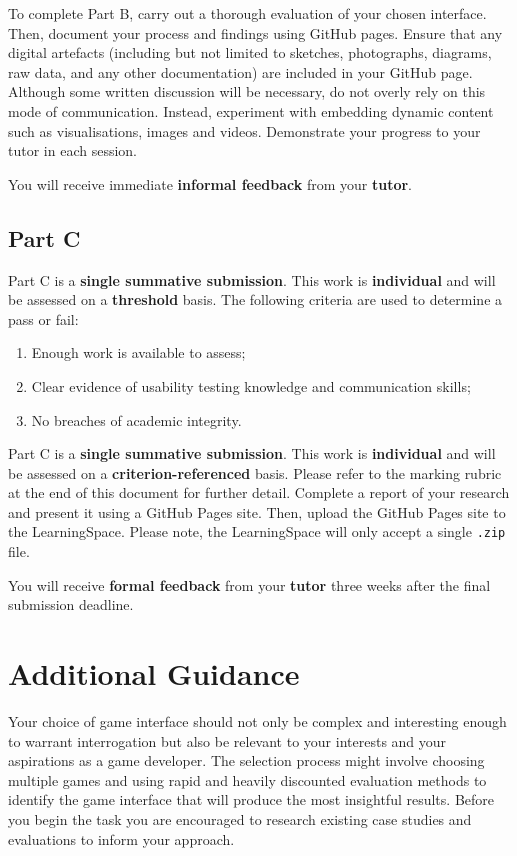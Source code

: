 \documentclass{../../fal_assignment}
\begin{document}
To complete Part B, carry out a thorough evaluation of your chosen interface. Then, document your process and findings using GitHub pages. Ensure that any digital artefacts (including but not limited to sketches, photographs, diagrams, raw data, and any other documentation) are included in your GitHub page. Although some written discussion will be necessary, do not overly rely on this mode of communication. Instead, experiment with embedding dynamic content such as visualisations, images and videos. Demonstrate your progress to your tutor in each session.

You will receive immediate \textbf{informal feedback} from your \textbf{tutor}.

\subsection*{Part C}

Part C is a \textbf{single summative submission}. This work is \textbf{individual} and will be assessed on a \textbf{threshold} basis. The following criteria are used to determine a pass or fail: 

\begin{enumerate}[label=(\alph*)]
	\item Enough work is available to assess; 
	\item Clear evidence of usability testing knowledge and communication skills; 
	\item No breaches of academic integrity. 
\end{enumerate}

Part C is a \textbf{single summative submission}. This work is \textbf{individual} and will be assessed on a \textbf{criterion-referenced} basis. Please refer to the marking rubric at the end of this document for further detail. Complete a report of your research and present it using a GitHub Pages site. Then, upload the GitHub Pages site to the LearningSpace. Please note, the LearningSpace will only accept a single \texttt{.zip} file. 

You will receive \textbf{formal feedback} from your \textbf{tutor} three weeks after the final submission deadline.

\section*{Additional Guidance}

Your choice of game interface should not only be complex and interesting enough to warrant interrogation but also be relevant to your interests and your aspirations as a game developer. The selection process might involve choosing multiple games and using rapid and heavily discounted evaluation methods to identify the game interface that will produce the most insightful results. Before you begin the task you are encouraged to research existing case studies and evaluations to inform your approach. 
\end{document}
